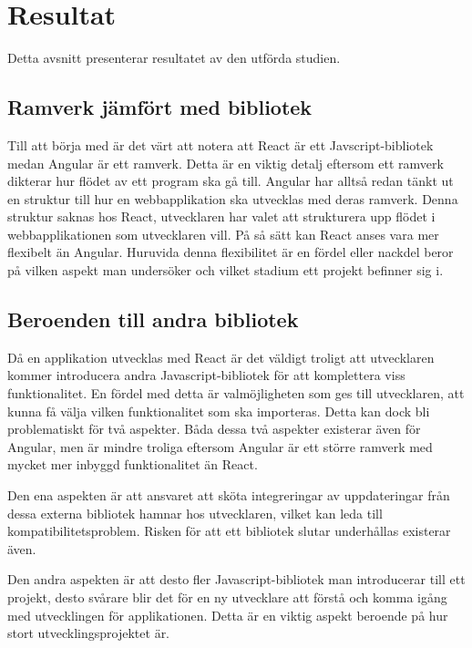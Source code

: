 \section{Resultat}
\label{sec:axel-results}
Detta avsnitt presenterar resultatet av den utförda studien.

\subsection{Ramverk jämfört med bibliotek}
Till att börja med är det värt att notera att React är ett Javscript-bibliotek medan Angular är ett ramverk. Detta är en viktig detalj eftersom ett ramverk dikterar hur flödet av ett program ska gå till. \cite[Avsnitt 2.4]{medium} Angular har alltså redan tänkt ut en struktur till hur en webbapplikation ska utvecklas med deras ramverk. Denna struktur saknas hos React, utvecklaren har valet att strukturera upp flödet i webbapplikationen som utvecklaren vill. På så sätt kan React anses vara mer flexibelt än Angular. Huruvida denna flexibilitet är en fördel eller nackdel beror på vilken aspekt man undersöker och vilket stadium ett projekt befinner sig i. 

\subsection{Beroenden till andra bibliotek}
\label{beroenden-till-andra-bibliotek}
Då en applikation utvecklas med React är det väldigt troligt att utvecklaren kommer introducera andra Javascript-bibliotek för att komplettera viss funktionalitet. \cite[Features]{sitepoint} En fördel med detta är valmöjligheten som ges till utvecklaren, att kunna få välja vilken funktionalitet som ska importeras. Detta kan dock bli problematiskt för två aspekter. Båda dessa två aspekter existerar även för Angular, men är mindre troliga eftersom Angular är ett större ramverk med mycket mer inbyggd funktionalitet än React.

Den ena aspekten är att ansvaret att sköta integreringar av uppdateringar från dessa externa bibliotek hamnar hos utvecklaren, vilket kan leda till kompatibilitetsproblem. Risken för att ett bibliotek slutar underhållas existerar även.

Den andra aspekten är att desto fler Javascript-bibliotek man introducerar till ett projekt, desto svårare blir det för en ny utvecklare att förstå och komma igång med utvecklingen för applikationen. Detta är en viktig aspekt beroende på hur stort utvecklingsprojektet är.


